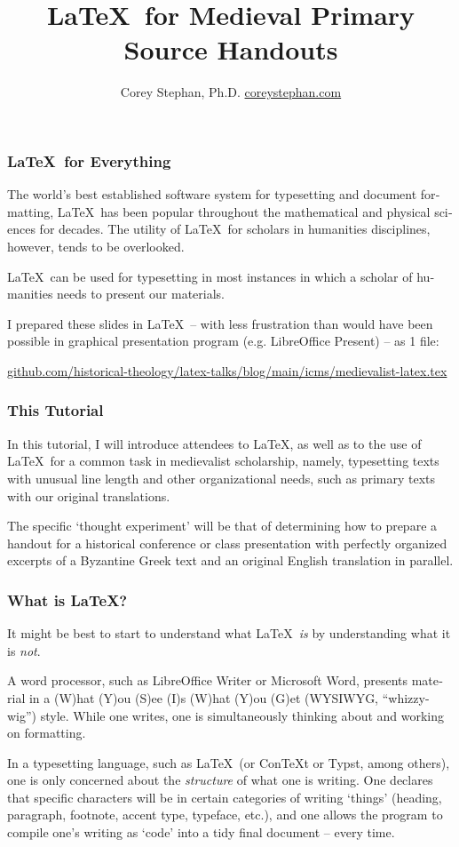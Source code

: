 \documentclass{beamer}
\title{\LaTeX\ for Medieval Primary Source Handouts}
\author{Corey Stephan, Ph.D. \break \href{https://www.coreystephan.com}{coreystephan.com}}
\begin{document}
\setdefaultlanguage{english}
	
\begin{frame}[plain]
    \maketitle
\end{frame}

\begin{frame}
    \frametitle[Everything]{\LaTeX\ for Everything}
The world's best established software system for typesetting and document formatting, \LaTeX\ has been popular throughout the mathematical and physical sciences for decades. The utility of \LaTeX\ for scholars in humanities disciplines, however, tends to be overlooked. \break

\LaTeX\ can be used for typesetting in most instances in which a scholar of humanities needs to present our materials. \break

I prepared these slides in \LaTeX\ -- with less frustration than would have been possible in graphical presentation program (e.g. LibreOffice Present) -- as 1 file: \break

\small{\href{https://github.com/historical-theology/latex-talks/blob/main/icms/medievalist-latex.tex}{github.com/historical-theology/latex-talks/blog/main/icms/medievalist-latex.tex}}
\end{frame}

\begin{frame}
	\frametitle[Tutorial]{This Tutorial}
In this tutorial, I will introduce attendees to \LaTeX, as well as to the use of \LaTeX\ for a common task in medievalist scholarship, namely, typesetting texts with unusual line length and other organizational needs, such as primary texts with our original translations. \break

The specific `thought experiment' will be that of determining how to prepare a handout for a historical conference or class presentation with perfectly organized excerpts of a Byzantine Greek text and an original English translation in parallel. \break
\end{frame}

\begin{frame}
	\frametitle[\LaTeX]{What is \LaTeX ?}
It might be best to start to understand what \LaTeX\ \emph{is} by understanding what it is \emph{not}. \break

A word processor, such as LibreOffice Writer or Microsoft Word, presents material in a (W)hat (Y)ou (S)ee (I)s (W)hat (Y)ou (G)et (WYSIWYG, ``whizzy-wig'') style. While one writes, one is simultaneously thinking about and working on formatting. \break

In a typesetting language, such as \LaTeX\ (or ConTeXt or Typst, among others), one is only concerned about the \emph{structure} of what one is writing. One declares that specific characters will be in certain categories of writing `things' (heading, paragraph, footnote, accent type, typeface, etc.), and one allows the program to compile one's writing as `code' into a tidy final document -- every time.
\end{frame}
\end{document}
